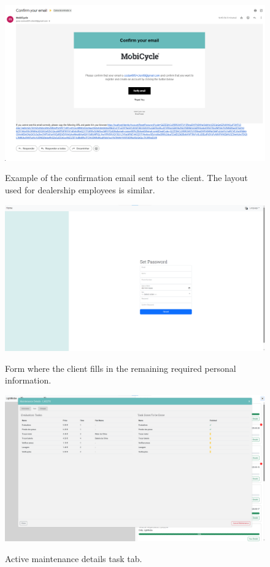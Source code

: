 \begin{figure}[htbp]
  \caption{Example of the confirmation email sent to the client. The layout used for dealership employees is similar.}
  \centering
  \includegraphics[width=\textwidth]{figs/Implementation/rececionist/CreateClient}
  \label{fig:CreateClient}
\end{figure}



\begin{figure}[htbp]
  \caption{Form where the client fills in the remaining required personal information.}
  \centering
  \includegraphics[width=\textwidth]{figs/Implementation/rececionist/SetPassword}
  \label{fig:SetPassword}
\end{figure}

\begin{figure}[htbp]
  \caption{Active maintenance details task tab.}
  \centering
  \includegraphics[width=\textwidth]{figs/Implementation/rececionist/maintenance_details_task}
  \label{fig:impReceMaintTask}
\end{figure}

